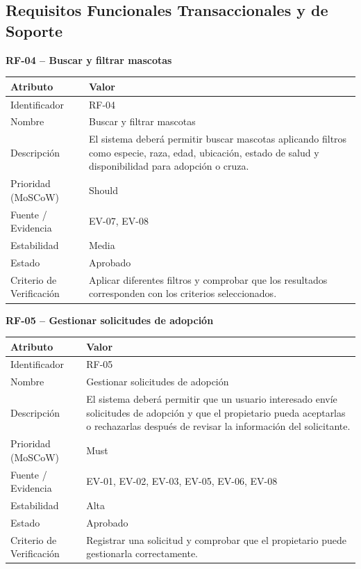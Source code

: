 \documentclass[journal,onecolumn]{IEEEtran}
\begin{document}
	\subsection*{Requisitos Funcionales Transaccionales y de Soporte}
	
	\textbf{RF-04 -- Buscar y filtrar mascotas}
	\begin{table}[H]
		\centering\small
		\begin{tabularx}{\linewidth}{|l|X|}
			\hline
			\textbf{Atributo} & \textbf{Valor} \\ \hline
			Identificador & RF-04 \\ \hline
			Nombre & Buscar y filtrar mascotas \\ \hline
			Descripción & El sistema deberá permitir buscar mascotas aplicando filtros como especie, raza, edad, ubicación, estado de salud y disponibilidad para adopción o cruza. \\ \hline
			Prioridad (MoSCoW) & Should \\ \hline
			Fuente / Evidencia & EV-07, EV-08 \\ \hline
			Estabilidad & Media \\ \hline
			Estado & Aprobado \\ \hline
			Criterio de Verificación & Aplicar diferentes filtros y comprobar que los resultados corresponden con los criterios seleccionados. \\ \hline
		\end{tabularx}
	\end{table}
	
	\textbf{RF-05 -- Gestionar solicitudes de adopción}
	\begin{table}[H]
		\centering\small
		\begin{tabularx}{\linewidth}{|l|X|}
			\hline
			\textbf{Atributo} & \textbf{Valor} \\ \hline
			Identificador & RF-05 \\ \hline
			Nombre & Gestionar solicitudes de adopción \\ \hline
			Descripción & El sistema deberá permitir que un usuario interesado envíe solicitudes de adopción y que el propietario pueda aceptarlas o rechazarlas después de revisar la información del solicitante. \\ \hline
			Prioridad (MoSCoW) & Must \\ \hline
			Fuente / Evidencia & EV-01, EV-02, EV-03, EV-05, EV-06, EV-08 \\ \hline
			Estabilidad & Alta \\ \hline
			Estado & Aprobado \\ \hline
			Criterio de Verificación & Registrar una solicitud y comprobar que el propietario puede gestionarla correctamente. \\ \hline
		\end{tabularx}
	\end{table}
	
\end{document}
